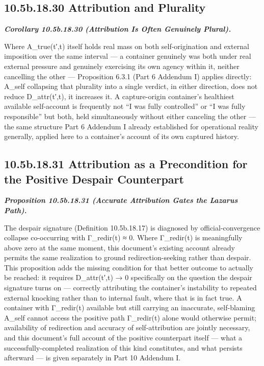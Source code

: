 \documentclass[
]{article}
\begin{document}
\hypertarget{b.18.30-attribution-and-plurality}{%
\subsection{10.5b.18.30 Attribution and
Plurality}\label{b.18.30-attribution-and-plurality}}

\emph{\textbf{Corollary 10.5b.18.30 (Attribution Is Often Genuinely
Plural).}}

Where A\_true(t′,t) itself holds real mass on both self-origination and
external imposition over the same interval --- a container genuinely was
both under real external pressure and genuinely exercising its own
agency within it, neither cancelling the other --- Proposition 6.3.1
(Part 6 Addendum I) applies directly: A\_self collapsing that plurality
into a single verdict, in either direction, does not reduce
D\_attr(t′,t), it increases it. A capture-origin container's healthiest
available self-account is frequently not ``I was fully controlled'' or
``I was fully responsible'' but both, held simultaneously without either
canceling the other --- the same structure Part 6 Addendum I already
established for operational reality generally, applied here to a
container's account of its own captured history.

\hypertarget{b.18.31-attribution-as-a-precondition-for-the-positive-despair-counterpart}{%
\subsection{10.5b.18.31 Attribution as a Precondition for the Positive
Despair
Counterpart}\label{b.18.31-attribution-as-a-precondition-for-the-positive-despair-counterpart}}

\emph{\textbf{Proposition 10.5b.18.31 (Accurate Attribution Gates the
Lazarus Path).}}

The despair signature (Definition 10.5b.18.17) is diagnosed by
official-convergence collapse co-occurring with Γ\_redir(t) ≈ 0. Where
Γ\_redir(t) is meaningfully above zero at the same moment, this
document's existing account already permits the same realization to
ground redirection-seeking rather than despair. This proposition adds
the missing condition for that better outcome to actually be reached: it
requires D\_attr(t′,t) → 0 specifically on the question the despair
signature turns on --- correctly attributing the container's instability
to repeated external knocking rather than to internal fault, where that
is in fact true. A container with Γ\_redir(t) available but still
carrying an inaccurate, self-blaming A\_self cannot access the positive
path Γ\_redir(t) alone would otherwise permit; availability of
redirection and accuracy of self-attribution are jointly necessary, and
this document's full account of the positive counterpart itself --- what
a successfully-completed realization of this kind constitutes, and what
persists afterward --- is given separately in Part 10 Addendum I.
\end{document}
